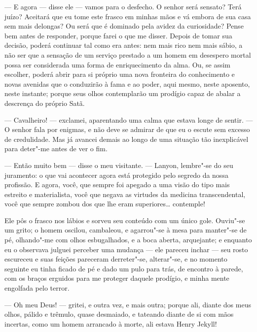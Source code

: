 --- E agora --- disse ele --- vamos para o desfecho.  O senhor será sensato?
 Terá juízo?  Aceitará que eu tome este frasco em minhas mãos e vá
embora de sua casa sem mais delongas?  Ou será que é dominado pela
avidez da curiosidade?  Pense bem antes de responder, porque farei o
que me disser.  Depois de tomar sua decisão, poderá continuar tal como
era antes: nem mais rico nem mais sábio, a não ser que a sensação de um
serviço prestado a um homem em desespero mortal possa ser considerada
uma forma de enriquecimento da alma.  Ou, se assim escolher, poderá
abrir para si próprio uma nova fronteira do conhecimento e novas
avenidas que o conduzirão à fama e ao poder, aqui mesmo, neste
aposento, neste instante; porque seus olhos contemplarão um prodígio
capaz de abalar a descrença do próprio Satã.

--- Cavalheiro! --- exclamei, aparentando uma calma que estava longe de
sentir. --- O senhor fala por enigmas, e não deve se admirar de que eu o
escute sem excesso de credulidade.  Mas já avancei demais ao longo de
uma situação tão inexplicável para deter"-me antes de ver o fim.

--- Então muito bem --- disse o meu visitante. --- Lanyon, lembre"-se do seu
juramento: o que vai acontecer agora está protegido pelo segredo da
nossa profissão.  E agora, você, que sempre foi apegado a uma visão do
tipo mais estreito e materialista, você que negava as virtudes da
medicina transcendental, você que sempre zombou dos que lhe eram
superiores\ldots{} contemple!

Ele pôs o frasco nos lábios e sorveu seu conteúdo com um único gole. 
Ouviu"-se um grito; o homem oscilou, cambaleou, e agarrou"-se à mesa para
manter"-se de pé, olhando"-me com olhos esbugalhados, e a boca aberta,
arquejante; e enquanto eu o observava julguei perceber uma mudança ---
ele pareceu inchar --- seu rosto escureceu e suas feições pareceram
derreter"-se, alterar"-se, e no momento seguinte eu tinha ficado de pé e
dado um pulo para trás, de encontro à parede, com os braços erguidos
para me proteger daquele prodígio, e minha mente engolfada pelo terror.

--- Oh meu Deus! --- gritei, e outra vez, e mais outra; porque ali, diante
dos meus olhos, pálido e trêmulo, quase desmaiado, e tateando diante de
si com mãos incertas, como um homem arrancado à morte, ali estava
Henry Jekyll!  

